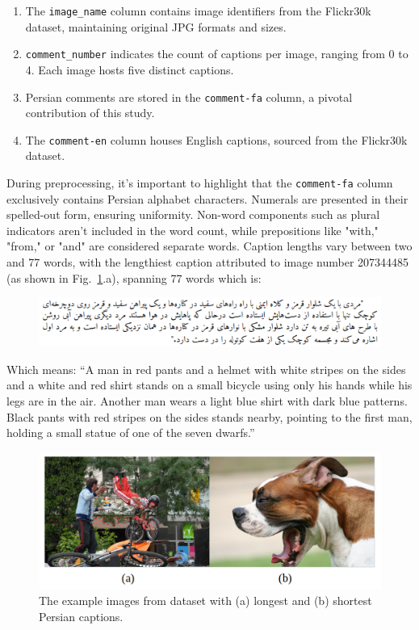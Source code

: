 \documentclass[lettersize,journal]{IEEEtran}
\begin{document}
\begin{enumerate}
  \item The \texttt{image\_name} column contains image identifiers from the Flickr30k dataset, maintaining original JPG formats and sizes.
  \item \texttt{comment\_number} indicates the count of captions per image, ranging from 0 to 4. Each image hosts five distinct captions.
  \item Persian comments are stored in the \texttt{comment-fa} column, a pivotal contribution of this study.
  \item The \texttt{comment-en} column houses English captions, sourced from the Flickr30k dataset.
\end{enumerate}


During preprocessing, it's important to highlight that the \texttt{comment-fa} column exclusively contains Persian alphabet characters. Numerals are presented in their spelled-out form, ensuring uniformity. Non-word components such as plural indicators aren't included in the word count, while prepositions like "with," "from," or "and" are considered separate words. Caption lengths vary between two and 77 words, with the lengthiest caption attributed to image number 207344485 (as shown in Fig.~\ref{fig1}.a), spanning 77 words which is:
\vspace{-10pt}
\begin{figure}[!htbp]
  \centering
  \includegraphics[width=\columnwidth]{fig2.png}
\end{figure}

\vspace{-15pt}
Which means: ``A man in red pants and a helmet with white stripes on the sides and a white and red shirt stands on a small bicycle using only his hands while his legs are in the air. Another man wears a light blue shirt with dark blue patterns. Black pants with red stripes on the sides stands nearby, pointing to the first man, holding a small statue of one of the seven dwarfs.''

\begin{figure}
  \centering
  \includegraphics[width=\columnwidth]{long_short.jpg}
  \caption{The example images from dataset with (a) longest and (b) shortest Persian captions.} \label{fig1}
\end{figure}
\end{document}
